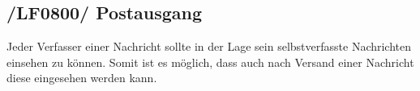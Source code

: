 \subsection{/LF0800/ Postausgang}
Jeder Verfasser einer Nachricht sollte in der Lage sein selbstverfasste Nachrichten einsehen zu können. Somit ist es möglich, dass auch nach Versand einer Nachricht diese eingesehen werden kann. 
